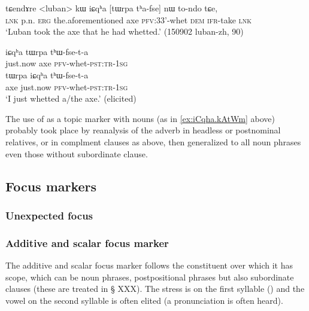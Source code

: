  \begin{exe}
\ex \label{ex:tWrpa.thafse}
 \gll  tɕendɤre <luban> kɯ iɕqʰa [tɯrpa tʰa-fse] nɯ to-ndo tɕe, \\
 \textsc{lnk} p.n. \textsc{erg} the.aforementioned axe \textsc{pfv}:3\fl{}3'-whet \textsc{dem} \textsc{ifr}-take \textsc{lnk} \\
 \glt `Luban took the axe that he had whetted.' (150902 luban-zh, 90)
 \end{exe}

  \begin{exe}
  \ex 
  \begin{xlist}
\ex \label{ex:tWrpa.thWfseta}
 \gll   iɕqʰa tɯrpa tʰɯ-fse-t-a \\
just.now axe \textsc{pfv}-whet-\textsc{pst}:\textsc{tr}-\textsc{1sg} \\
\ex \label{ex:tWrpa.thWfseta2}
 \gll   tɯrpa  iɕqʰa tʰɯ-fse-t-a \\
 axe just.now \textsc{pfv}-whet-\textsc{pst}:\textsc{tr}-\textsc{1sg} \\
 \glt `I just whetted a/the axe.' (elicited)
 \end{xlist}
 \end{exe}

The use of  as a topic marker with nouns (as in \ref{ex:iCqha.kAtWm} above) probably took place by reanalysis of the adverb in headless or postnominal relatives, or in complment clauses as above, then generalized to all noun phrases even those without subordinate clause.

 \subsection{Focus markers} \label{sec:focus}
   \subsubsection{Unexpected focus} \label{sec:unexpected}
 \subsubsection{Additive and scalar focus marker  } \label{sec:kWnA}
The additive and scalar focus marker  follows the constituent over which it has scope, which can be noun phrases, postpositional phrases but also subordinate clauses (these are treated in § XXX). The stress is on the first syllable () and the vowel on the second syllable is often elited (a pronunciation  is often heard).

